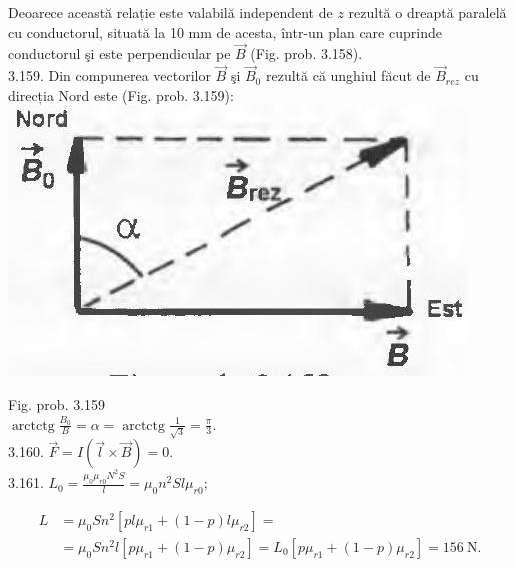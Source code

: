 \documentclass[10pt]{article}
\begin{document}
Deoarece această relație este valabilă independent de $z$ rezultă o dreaptă paralelă cu conductorul, situată la 10 mm de acesta, într-un plan care cuprinde conductorul şi este perpendicular pe $\vec{B}$ (Fig. prob. 3.158).\\
3.159. Din compunerea vectorilor $\vec{B}$ şi $\vec{B}_{0}$ rezultă că unghiul făcut de $\vec{B}_{r e z}$ cu direcția Nord este (Fig. prob. 3.159):\\
\includegraphics[max width=\textwidth, center]{2025_07_01_5b3ff9fa0d508c8e9f17g-373(1)}

Fig. prob. 3.159\\
$\operatorname{arctctg} \frac{B_{0}}{B}=\alpha=\operatorname{arctctg} \frac{1}{\sqrt{3}}=\frac{\pi}{3}$.\\
3.160. $\vec{F}=I(\vec{l} \times \vec{B})=0$.\\
3.161. $L_{0}=\frac{\mu_{0} \mu_{r 0} N^{2} S}{l}=\mu_{0} n^{2} S l \mu_{r 0}$;

$$
\begin{aligned}
L & =\mu_{0} S n^{2}\left[p l \mu_{r 1}+(1-p) l \mu_{r 2}\right]= \\
& =\mu_{0} S n^{2} l\left[p \mu_{r 1}+(1-p) \mu_{r 2}\right]=L_{0}\left[p \mu_{r 1}+(1-p) \mu_{r 2}\right]=156 \mathrm{~N} .
\end{aligned}
$$
\end{document}
